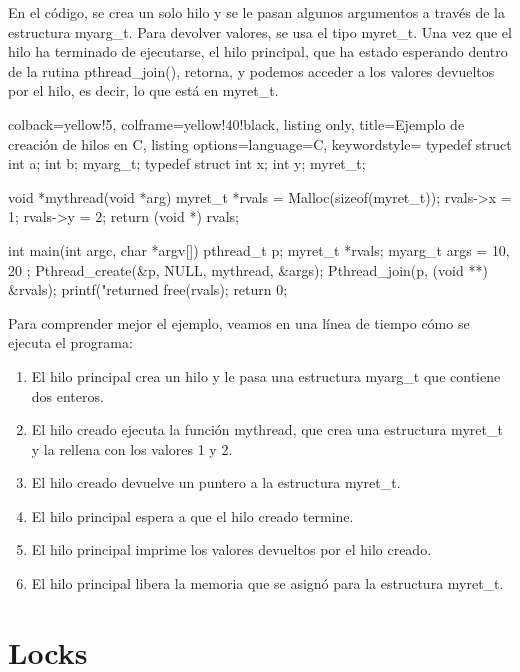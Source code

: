 \documentclass[openany]{book}
\begin{document}
En el código, se crea un solo hilo y se le pasan algunos argumentos a través de la estructura myarg\_t. Para devolver valores, se usa el tipo myret\_t. Una vez que el hilo ha terminado de ejecutarse, el hilo principal, que ha estado esperando dentro de la rutina pthread\_join(), retorna, y podemos acceder a los valores devueltos por el hilo, es decir, lo que está en myret\_t.

\begin{tcblisting}{colback=yellow!5, colframe=yellow!40!black, listing only, title=Ejemplo de creación de hilos en C, listing options={language=C, keywordstyle=\color{blue!35!white}\bfseries}}
typedef struct { int a; int b; } myarg_t;
typedef struct { int x; int y; } myret_t;
    
void *mythread(void *arg) {
    myret_t *rvals = Malloc(sizeof(myret_t));
    rvals->x = 1;
    rvals->y = 2;
    return (void *) rvals;
}
    
int main(int argc, char *argv[]) {
    pthread_t p;
    myret_t *rvals;
    myarg_t args = { 10, 20 };
    Pthread_create(&p, NULL, mythread, &args);
    Pthread_join(p, (void **) &rvals);
    printf("returned %
    free(rvals);
    return 0;
}
\end{tcblisting}

Para comprender mejor el ejemplo, veamos en una línea de tiempo cómo se ejecuta el programa:

\begin{enumerate}
    \item El hilo principal crea un hilo y le pasa una estructura myarg\_t que contiene dos enteros.
    \item El hilo creado ejecuta la función mythread, que crea una estructura myret\_t y la rellena con los valores 1 y 2.
    \item El hilo creado devuelve un puntero a la estructura myret\_t.
    \item El hilo principal espera a que el hilo creado termine.
    \item El hilo principal imprime los valores devueltos por el hilo creado.
    \item El hilo principal libera la memoria que se asignó para la estructura myret\_t.
\end{enumerate}
    
\section{Locks}
\end{document}
